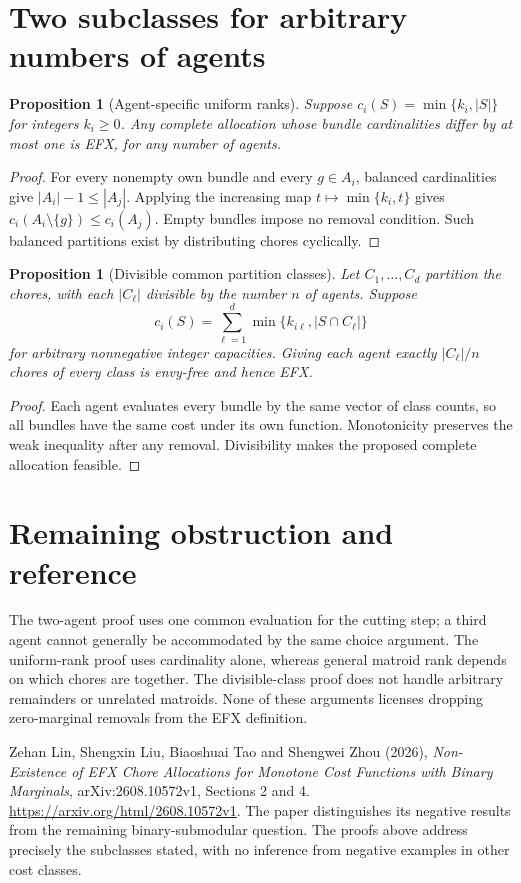 \documentclass[11pt,a4paper]{article}
\newtheorem{proposition}[theorem]{Proposition}
\theoremstyle{definition}
\theoremstyle{remark}
\begin{document}
\section{Two subclasses for arbitrary numbers of agents}
\begin{proposition}[Agent-specific uniform ranks]
Suppose $c_i(S)=\min\{k_i,|S|\}$ for integers $k_i\geq0$. Any complete allocation whose bundle cardinalities differ by at most one is EFX, for any number of agents.
\end{proposition}
\begin{proof}
For every nonempty own bundle and every $g\in A_i$, balanced cardinalities give $|A_i|-1\leq|A_j|$. Applying the increasing map $t\mapsto\min\{k_i,t\}$ gives $c_i(A_i\setminus\{g\})\leq c_i(A_j)$. Empty bundles impose no removal condition. Such balanced partitions exist by distributing chores cyclically.
\end{proof}

\begin{proposition}[Divisible common partition classes]
Let $C_1,\ldots,C_d$ partition the chores, with each $|C_\ell|$ divisible by the number $n$ of agents. Suppose
\[
 c_i(S)=\sum_{\ell=1}^d\min\{k_{i\ell},|S\cap C_\ell|\}
\]
for arbitrary nonnegative integer capacities. Giving each agent exactly $|C_\ell|/n$ chores of every class is envy-free and hence EFX.
\end{proposition}
\begin{proof}
Each agent evaluates every bundle by the same vector of class counts, so all bundles have the same cost under its own function. Monotonicity preserves the weak inequality after any removal. Divisibility makes the proposed complete allocation feasible.
\end{proof}

\section{Remaining obstruction and reference}
The two-agent proof uses one common evaluation for the cutting step; a third agent cannot generally be accommodated by the same choice argument. The uniform-rank proof uses cardinality alone, whereas general matroid rank depends on which chores are together. The divisible-class proof does not handle arbitrary remainders or unrelated matroids. None of these arguments licenses dropping zero-marginal removals from the EFX definition.

Zehan Lin, Shengxin Liu, Biaoshuai Tao and Shengwei Zhou (2026), \emph{Non-Existence of EFX Chore Allocations for Monotone Cost Functions with Binary Marginals}, arXiv:2608.10572v1, Sections 2 and 4. \url{https://arxiv.org/html/2608.10572v1}. The paper distinguishes its negative results from the remaining binary-submodular question. The proofs above address precisely the subclasses stated, with no inference from negative examples in other cost classes.
\end{document}
